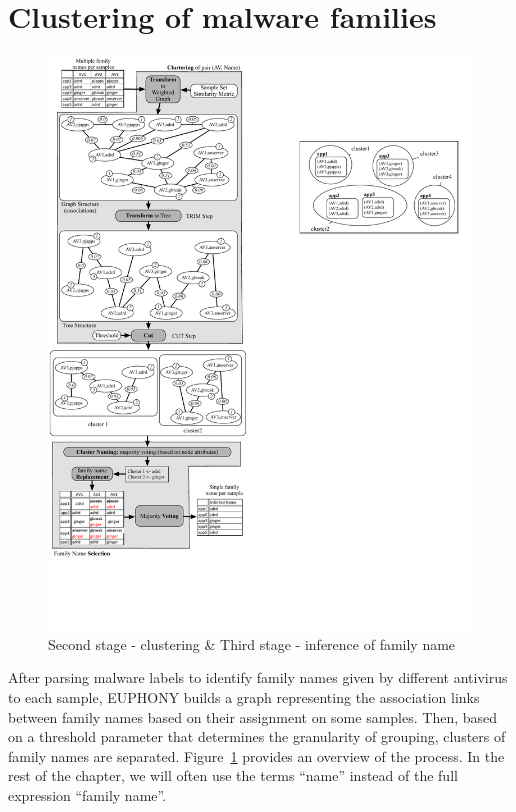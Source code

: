
\section{Clustering of malware families}

\begin{figure}
	\centering
	\includegraphics[height=\textheight]{figures/euphony/clustering03.pdf}
	\caption{Second stage - clustering \& Third stage - inference of family name}
	\label{figure:euphony:clustering}
\end{figure}

After parsing malware labels to identify family names given by different antivirus to each sample, EUPHONY builds a graph representing the association links between family names based on their assignment on some samples.
Then, based on a threshold parameter that determines the granularity of grouping, clusters of family names are separated.
Figure~\ref{figure:euphony:clustering} provides an overview of the process.
In the rest of the chapter, we will often use the terms ``name'' instead of the full expression ``family name''.
